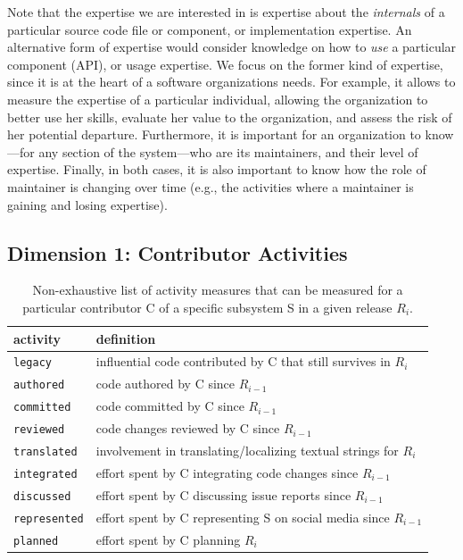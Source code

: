 Note that the expertise we are interested in is expertise about the {\em internals} of a particular source code file or component, or implementation expertise. An alternative form of expertise would consider knowledge on how to {\em use} a particular component (API), or usage expertise. We focus on the former kind of expertise, since it is at the heart of a software organizations needs. For example, it allows to measure the expertise of a particular individual, allowing the organization to better use her skills, evaluate her value to the
organization, and assess the risk of her potential departure. Furthermore, it is important for an organization to know---for any
section of the system---who are its maintainers, and their level of expertise. Finally, in both cases, it is also
important to know how the role of maintainer is changing over time (e.g., the activities where a maintainer is gaining and losing
expertise).






\subsection{Dimension 1: Contributor Activities}
\label{sec:contribution-metrics}

\begin{table}[t]
\begin{center}
\begin{tabular}{ll}
activity & definition\\
\hline
\texttt{legacy} & influential code contributed by C that still survives in $R_i$\\
\texttt{authored} & code authored by C since $R_{i-1}$\\
\texttt{committed} & code committed by C since $R_{i-1}$\\
  \texttt{reviewed} & code changes reviewed by C since $R_{i-1}$\\
    \texttt{translated} & involvement in translating/localizing textual strings for $R_{i}$\\
  \texttt{integrated} & effort spent by C integrating code changes since $R_{i-1}$\\
  \texttt{discussed} & effort spent by C discussing issue reports since $R_{i-1}$\\
  \texttt{represented} & effort spent by C representing S on social media since $R_{i-1}$\\
      \texttt{planned} & effort spent by C planning $R_{i}$\\
\end{tabular}
\end{center}
\caption{Non-exhaustive list of activity measures that can be measured for a particular contributor C of a specific subsystem S in a given release $R_i$.}
\label{tab:met}
\end{table}

